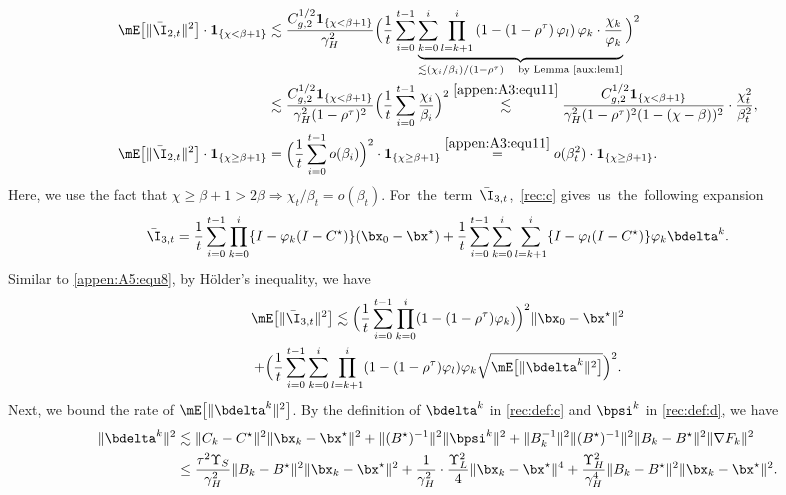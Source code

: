 \begin{align}\label{appen:A5:equ13}
\mE\big[\|\bar{\I}_{2, t}\|^2\big]\cdot\mathbf{1}_{\{\chi<\beta+1\}} &\lesssim  \frac{C_{g,2}^{1/2}\mathbf{1}_{\{\chi<\beta+1\}}}{\gamma_H^2}\Big(\frac{1}{t}\sum_{i=0}^{t-1} \underbrace{\sum_{k=0}^{i} \prod_{l=k+1}^i\left(1-\left(1-\rho^\tau\right) \varphi_l\right)\varphi_k\cdot \frac{\chi_k}{\varphi_k}}_{\lesssim (\chi_{i}/\beta_i)/(1-\rho^\tau)\quad\text{by Lemma \ref{aux:lem1}}}\Big)^2\nonumber\\
&\lesssim \frac{C_{g,2}^{1/2} \mathbf{1}_{\{\chi<\beta+1\}}}{\gamma_H^2(1-\rho^\tau)^2}\Big(\frac{1}{t}\sum_{i=0}^{t-1}\frac{\chi_i}{\beta_i}\Big)^2    \stackrel{\eqref{appen:A3:equ11}}{\lesssim} \frac{C_{g,2}^{1/2}\mathbf{1}_{\{\chi<\beta+1\}}}{\gamma_H^2(1-\rho^\tau)^2(1-(\chi-\beta))^2}\cdot \frac{\chi_t^2}{\beta_t^2},\\
\mE\big[\|\bar{\I}_{2, t}\|^2\big]\cdot\mathbf{1}_{\{\chi\geq \beta+ 1\}} &= \Big(\frac{1}{t}\sum_{i=0}^{t-1} o(\beta_i)\Big)^2\cdot \mathbf{1}_{\{\chi\geq \beta+ 1\}} \stackrel{\eqref{appen:A3:equ11}}{=} o(\beta_t^2)\cdot \mathbf{1}_{\{\chi\geq \beta+ 1\}}. \nonumber
\end{align}
Here, we use the fact that $\chi\geq \beta+1 > 2\beta \Rightarrow \chi_t/\beta_t = o(\beta_t)$. For~the~term~$\bar{\I}_{3,t}$,~\eqref{rec:c} gives~us~the~following expansion
\begin{equation*}
\bar{\I}_{3, t}=\frac{1}{t} \sum_{i=0}^{t-1} \prod_{k=0}^i \{I-\varphi_k (I-C^\star)\} (\bx_0-\bx^\star) +\frac{1}{t} \sum_{i=0}^{t-1} \sum_{k=0}^i \sum_{ l=k+1}^i \{I-\varphi_l (I-C^\star)\} \varphi_k \bdelta^k.
\end{equation*}
Similar to \eqref{appen:A5:equ8}, by H\"older's inequality, we have
\begin{multline}\label{appen:A5:equ11}
\mE\big[\|\bar{\I}_{3,t}\|^2\big]\lesssim \Big(\frac{1}{t}\sum_{i=0}^{t-1}\prod_{k=0}^i(1-(1-\rho^\tau)\varphi_k)\Big)^2\|\bx_0-\bx^\star\|^2\\
+ \Big(\frac{1}{t}\sum_{i=0}^{t-1}\sum_{k=0}^i\prod_{l=k+1}^i(1-(1-\rho^\tau)\varphi_l)\varphi_k\sqrt{\mE\big[\|\bdelta^k\|^2\big]}\Big)^2.
\end{multline}
Next, we bound the rate of  $\mE\big[\|\bdelta^k\|^2\big]$. By the definition of $\bdelta^k$ in \eqref{rec:def:c} and $\bpsi^k$  in \eqref{rec:def:d}, we have
\begin{align*}
\|\bdelta^k\|^2 &\lesssim \|C_k-C^\star\|^2\|\bx_k-\bx^\star\|^2+\|(B^{\star})^{-1}\|^2\|\bpsi^k\|^2 + \|B_k^{-1}\|^2\|(B^{\star})^{-1}\|^2\|B_k-B^\star\|^2\|\nabla F_k\|^2\\
&\leq \frac{\tau^2\Upsilon_S}{\gamma_H^2}\|B_k-B^\star\|^2 \|\bx_k-\bx^\star\|^2 + \frac{1}{\gamma_H^2}\cdot \frac{\Upsilon_L^2}{4}\|\bx_k-\bx^\star\|^4 + \frac{\Upsilon_H^2}{\gamma_H^4}\|B_k-B^\star\|^2 \|\bx_k-\bx^\star\|^2.
\end{align*}

